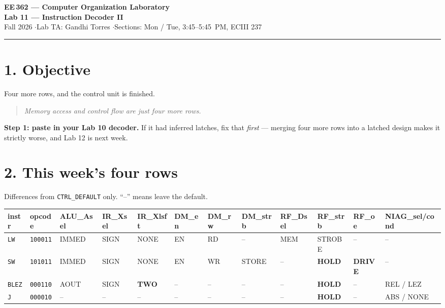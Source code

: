 \documentclass[11pt]{article}
\newcommand{\code}[1]{\texttt{#1}}
\newcommand{\hr}{\vspace{2pt}\hrule\vspace{6pt}}
\begin{document}
\begin{center}
{\Large\bfseries EE\,362 --- Computer Organization Laboratory}\\[2pt]
{\large\bfseries Lab 11 --- Instruction Decoder II}\\[4pt]
Fall 2026 \quad$\cdot$\quad Lab TA: Gandhi Torres \quad$\cdot$\quad Sections: Mon / Tue, 3:45--5:45~PM, ECIII 237
\end{center}
\hr

\section*{1. Objective}

Four more rows, and the control unit is finished.

\begin{quote}
\emph{Memory access and control flow are just four more rows.}
\end{quote}

\textbf{Step 1: paste in your Lab 10 decoder.} If it had inferred latches, fix
that \emph{first} --- merging four more rows into a latched design makes it
strictly worse, and Lab 12 is next week.

\section*{2. This week's four rows}

Differences from \code{CTRL\_DEFAULT} only. ``--'' means leave the default.

\begin{center}
\scriptsize
\begin{tabular}{llllllllllll}
\toprule
instr & opcode & ALU\_Asel & IR\_Xsel & IR\_Xlsft & DM\_en & DM\_rw & DM\_strb & RF\_Dsel & RF\_strb & RF\_oe & NIAG\_sel/cond \\
\midrule
\code{LW}   & \code{100011} & IMMED & SIGN & NONE & EN & RD & -- & MEM & STROBE & -- & -- \\
\code{SW}   & \code{101011} & IMMED & SIGN & NONE & EN & WR & STORE & -- & \textbf{HOLD} & \textbf{DRIVE} & -- \\
\code{BLEZ} & \code{000110} & AOUT & SIGN & \textbf{TWO} & -- & -- & -- & -- & \textbf{HOLD} & -- & REL / LEZ \\
\code{J}    & \code{000010} & -- & -- & -- & -- & -- & -- & -- & \textbf{HOLD} & -- & ABS / NONE \\
\bottomrule
\end{tabular}
\end{center}
\end{document}
